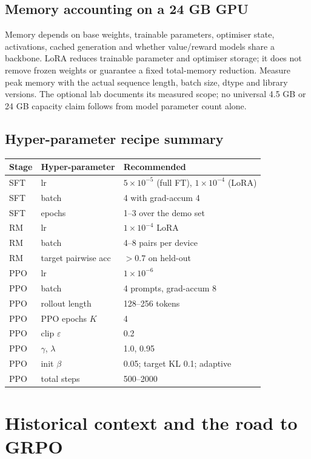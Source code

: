 \documentclass[11pt,oneside]{scrbook}
\begin{document}
\section{Memory accounting on a 24 GB GPU}

Memory depends on base weights, trainable parameters, optimiser state,
activations, cached generation and whether value/reward models share a backbone.
LoRA reduces trainable parameter and optimiser storage; it does not remove
frozen weights or guarantee a fixed total-memory reduction. Measure peak
memory with the actual sequence length, batch size, dtype and library versions.
The optional lab documents its measured scope; no universal 4.5 GB or 24 GB
capacity claim follows from model parameter count alone.

\section{Hyper-parameter recipe summary}

\begin{center}
\small
\begin{tabular}{lll}
\toprule
Stage & Hyper-parameter & Recommended \\
\midrule
SFT & lr & $5 \times 10^{-5}$ (full FT), $1 \times 10^{-4}$ (LoRA) \\
SFT & batch & 4 with grad-accum 4 \\
SFT & epochs & 1--3 over the demo set \\
RM  & lr & $1 \times 10^{-4}$ LoRA \\
RM  & batch & 4--8 pairs per device \\
RM  & target pairwise acc & $> 0.7$ on held-out \\
PPO & lr & $1 \times 10^{-6}$ \\
PPO & batch & 4 prompts, grad-accum 8 \\
PPO & rollout length & 128--256 tokens \\
PPO & PPO epochs $K$ & 4 \\
PPO & clip $\varepsilon$ & 0.2 \\
PPO & $\gamma$, $\lambda$ & 1.0, 0.95 \\
PPO & init $\beta$ & 0.05; target KL 0.1; adaptive \\
PPO & total steps & 500--2000 \\
\bottomrule
\end{tabular}
\end{center}

\chapter{Historical context and the road to GRPO}
\end{document}
